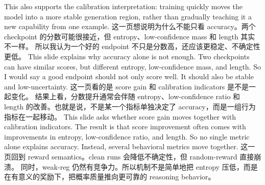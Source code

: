 {}This also supports the calibration interpretation: training quickly moves the model into a more stable generation region, rather than gradually teaching it a new capability from one example.\markdownRendererInterblockSeparator
{}\markdownRendererHorizontalRule{}\markdownRendererInterblockSeparator
{}\markdownRendererInterblockSeparator
{}\markdownRendererInterblockSeparator
{}这一页想说明为什么不能只看 accuracy。两个 checkpoint 的分数可能很接近，但 entropy、low-confidence mass 和 length 其实不一样。\markdownRendererInterblockSeparator
{}所以我认为一个好的 endpoint 不只是分数高，还应该更稳定、不确定性更低。\markdownRendererInterblockSeparator
{}\markdownRendererInterblockSeparator
{}This slide explains why accuracy alone is not enough. Two checkpoints can have similar scores, but different entropy, low-confidence mass, and length.\markdownRendererInterblockSeparator
{}So I would say a good endpoint should not only score well. It should also be stable and low-uncertainty.\markdownRendererInterblockSeparator
{}\markdownRendererHorizontalRule{}\markdownRendererInterblockSeparator
{}\markdownRendererInterblockSeparator
{}\markdownRendererInterblockSeparator
{}这一页看的是 score gain 和 calibration indicators 是不是一起变化。\markdownRendererInterblockSeparator
{}结果上看，分数提升通常会伴随 entropy、low-confidence ratio 和 length 的改善。也就是说，不是某一个指标单独决定了 accuracy，而是一组行为指标在一起移动。\markdownRendererInterblockSeparator
{}\markdownRendererInterblockSeparator
{}This slide asks whether score gain moves together with calibration indicators.\markdownRendererInterblockSeparator
{}The result is that score improvement often comes with improvements in entropy, low-confidence ratio, and length. So no single metric alone explains accuracy. Instead, several behavioral metrics move together.\markdownRendererInterblockSeparator
{}\markdownRendererHorizontalRule{}\markdownRendererInterblockSeparator
{}\markdownRendererInterblockSeparator
{}\markdownRendererInterblockSeparator
{}这一页回到 reward semantics。clean runs 会降低不确定性，但 random-reward 直接崩溃。\markdownRendererInterblockSeparator
{}同时，weak-reg 仍然有竞争力。所以机制不是简单地把 entropy 压低，而是在有意义的奖励下，把概率质量推向更可靠的 reasoning behavior。\markdownRendererInterblockSeparator
